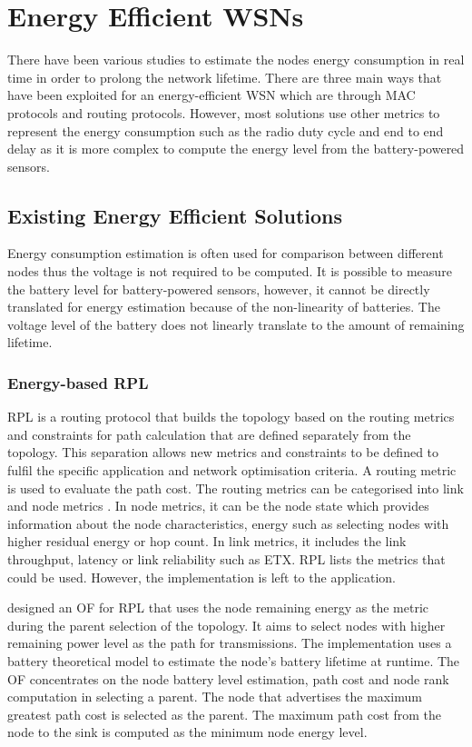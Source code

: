 \chapter{Energy Efficient WSNs}
\label{energyLoss}
There have been various studies to estimate the nodes energy consumption in real time in order to prolong the network lifetime. There are three main ways that have been exploited for an energy-efficient WSN which are through MAC protocols and routing protocols. However, most solutions use other metrics to represent the energy consumption such as the radio duty cycle and end to end delay as it is more complex to compute the energy level from the battery-powered sensors. 

\section{Existing Energy Efficient Solutions}
Energy consumption estimation is often used for comparison between different nodes thus the voltage is not required to be computed. It is possible to measure the battery level for battery-powered sensors, however, it cannot be directly translated for energy estimation because of the non-linearity of batteries. The voltage level of the battery does not linearly translate to the amount of remaining lifetime.

\subsection{Energy-based RPL}
RPL is a routing protocol that builds the topology based on the routing metrics and constraints for path calculation that are defined separately from the topology. This separation allows new metrics and constraints to be defined to fulfil the specific application and network optimisation criteria. A routing metric is used to evaluate the path cost. The routing metrics can be categorised into link and node metrics \cite{routingmetrics}. In node metrics, it can be the node state which provides information about the node characteristics, energy such as selecting nodes with higher residual energy or hop count. In link metrics, it includes the link throughput, latency or link reliability such as ETX. RPL lists the metrics that could be used. However, the implementation is left to the application. 

\cite{energyrpl} designed an OF for RPL that uses the node remaining energy as the metric during the parent selection of the topology. It aims to select nodes with higher remaining power level as the path for transmissions. The implementation uses a battery theoretical model \cite{sensornets13} to estimate the node's battery lifetime at runtime. The OF concentrates on the node battery level estimation, path cost and node rank computation in selecting a parent. The node that advertises the maximum greatest path cost is selected as the parent. The maximum path cost from the node to the sink is computed as the minimum node energy level. 


